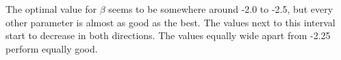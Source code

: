 The optimal value for $\beta$ seems to be somewhere around -2.0 to -2.5, but every other parameter is almost as good as the best.
The values next to this interval start to decrease in both directions.
The values equally wide apart from -2.25 perform equally good.
